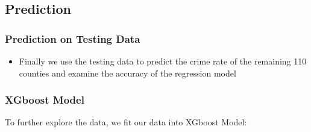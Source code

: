 \documentclass{beamer}
\begin{document}
\subsection{Prediction}
\begin{frame}[fragile]
\frametitle{Prediction on Testing Data}
\begin{itemize}
\item Finally we use the testing data to predict the crime rate of the remaining 110 counties and examine the accuracy of the regression model
\end{itemize}
\begin{center}
\end{center}
\end{frame}


\begin{frame}[fragile]
\frametitle{XGboost Model}
To further explore the data, we fit our data into XGboost Model:
\begin{center}
\end{center}
\end{frame}
\end{document}
